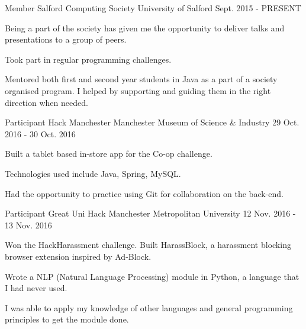 

\begin{cventries}

  \cventry
    {Member} %
    {Salford Computing Society} %
    {University of Salford} %
    {Sept. 2015 - PRESENT} %
    {
      \begin{cvitems} %
        \item {Being a part of the society has given me the opportunity to deliver talks and presentations to a group of peers.}
        \item {Took part in regular programming challenges.}
        \item {Mentored both first and second year students in Java as a part of a society organised program. I helped by supporting and guiding them in the right direction when needed.}
      \end{cvitems}
    }

  \cventry
    {Participant} %
    {Hack Manchester} %
    {Manchester Museum of Science \& Industry} %
    {29 Oct. 2016 - 30 Oct. 2016} %
    {
      \begin{cvitems} %
        \item {Built a tablet based in-store app for the Co-op challenge. }
        \item {Technologies used include Java, Spring, MySQL.}
        \item {Had the opportunity to practice using Git for collaboration on the back-end.}
      \end{cvitems}
    }

  \cventry
    {Participant} %
    {Great Uni Hack} %
    {Manchester Metropolitan University} %
    {12 Nov. 2016 - 13 Nov. 2016} %
    {
      \begin{cvitems} %
        \item {Won the HackHarassment challenge. Built HarassBlock, a harassment blocking browser extension inspired by Ad-Block.}
        \item {Wrote a NLP (Natural Language Processing) module in Python, a language that I had never used.}
        \item {I was able to apply my knowledge of other languages and general programming principles to get the module done.}
      \end{cvitems}
    }


\end{cventries}
